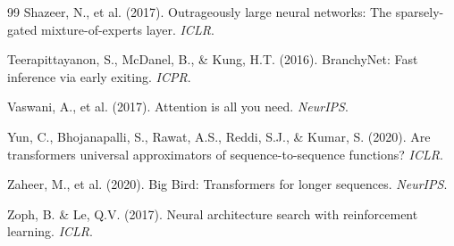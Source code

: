 \documentclass[11pt,a4paper]{article}
\theoremstyle{plain}
\theoremstyle{definition}
\theoremstyle{remark}
\begin{document}
\begin{thebibliography}{99}
Shazeer, N., et al. (2017). Outrageously large neural networks: The sparsely-gated mixture-of-experts layer. \textit{ICLR}.

Teerapittayanon, S., McDanel, B., \& Kung, H.T. (2016). BranchyNet: Fast inference via early exiting. \textit{ICPR}.

Vaswani, A., et al. (2017). Attention is all you need. \textit{NeurIPS}.

Yun, C., Bhojanapalli, S., Rawat, A.S., Reddi, S.J., \& Kumar, S. (2020). Are transformers universal approximators of sequence-to-sequence functions? \textit{ICLR}.

Zaheer, M., et al. (2020). Big Bird: Transformers for longer sequences. \textit{NeurIPS}.

Zoph, B. \& Le, Q.V. (2017). Neural architecture search with reinforcement learning. \textit{ICLR}.

\end{thebibliography}
\end{document}
